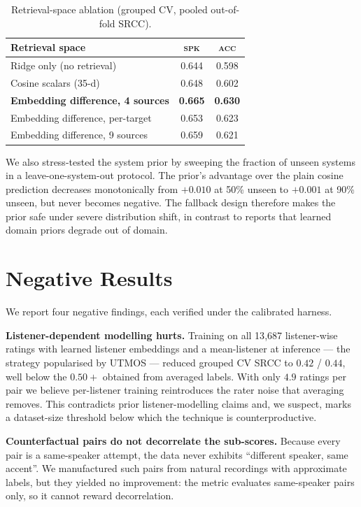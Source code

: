 \documentclass{article}
\begin{document}
\begin{table}[t]
\centering
\caption{Retrieval-space ablation (grouped CV, pooled out-of-fold SRCC).}
\label{tab:ablate}
\small
\begin{tabular}{lcc}
\toprule
Retrieval space & \textsc{spk} & \textsc{acc} \\
\midrule
Ridge only (no retrieval)            & 0.644 & 0.598 \\
Cosine scalars (35-d)                & 0.648 & 0.602 \\
\textbf{Embedding difference, 4 sources} & \textbf{0.665} & \textbf{0.630} \\
Embedding difference, per-target     & 0.653 & 0.623 \\
Embedding difference, 9 sources      & 0.659 & 0.621 \\
\bottomrule
\end{tabular}
\end{table}

We also stress-tested the system prior by sweeping the fraction of unseen systems
in a leave-one-system-out protocol. The prior's advantage over the plain cosine
prediction decreases monotonically from $+0.010$ at 50\% unseen to $+0.001$ at
90\% unseen, but never becomes negative. The fallback design therefore makes the
prior safe under severe distribution shift, in contrast to reports that learned
domain priors degrade out of domain.

\section{Negative Results}

We report four negative findings, each verified under the calibrated harness.

\textbf{Listener-dependent modelling hurts.} Training on all 13{,}687
listener-wise ratings with learned listener embeddings and a mean-listener at
inference --- the strategy popularised by UTMOS \cite{utmos} --- reduced grouped
CV SRCC to $0.42$ / $0.44$, well below the $0.50+$ obtained from averaged labels.
With only $4.9$ ratings per pair we believe per-listener training reintroduces
the rater noise that averaging removes. This contradicts prior listener-modelling
claims and, we suspect, marks a dataset-size threshold below which the technique
is counterproductive.

\textbf{Counterfactual pairs do not decorrelate the sub-scores.} Because every
pair is a same-speaker attempt, the data never exhibits ``different speaker,
same accent''. We manufactured such pairs from natural recordings with
approximate labels, but they yielded no improvement: the metric evaluates
same-speaker pairs only, so it cannot reward decorrelation.
\end{document}
